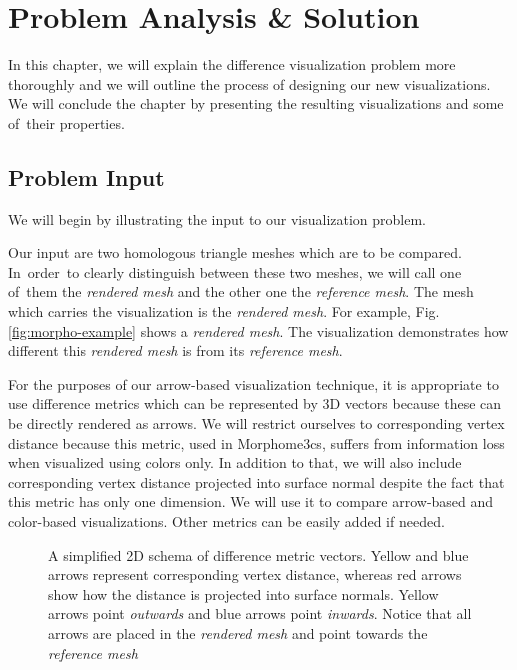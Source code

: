 \chapter{Problem Analysis \& Solution}
\label{chap:analysis}

In this chapter, we will explain the difference visualization problem more thoroughly and we will outline the process of designing our new visualizations. We will conclude the chapter by presenting the resulting visualizations and some of~their properties.

\section{Problem Input}
\label{sec:analysis-input}

We will begin by illustrating the input to our visualization problem.

Our input are two homologous triangle meshes which are to be compared. In~order~to clearly distinguish between these two meshes, we will call one of~them the {\it rendered mesh} and the other one the {\it reference mesh}. The mesh which carries the visualization is the {\it rendered mesh}. For example, Fig. \ref{fig:morpho-example} shows a {\it rendered mesh}. The visualization demonstrates how different this {\it rendered mesh} is from its {\it reference mesh}.

For the purposes of our arrow-based visualization technique, it is appropriate to use difference metrics which can be represented by 3D vectors because these can be directly rendered as arrows. We will restrict ourselves to corresponding vertex distance because this metric, used in Morphome3cs, suffers from information loss when visualized using colors only. In addition to that, we will also include corresponding vertex distance projected into surface normal despite the fact that this metric has only one dimension. We will use it to compare arrow-based and color-based visualizations. Other metrics can be easily added if needed.

\begin{figure}[h]
	\centering
	\def\svgwidth{\textwidth}
	
	\caption[Input illustration]{A simplified 2D schema of difference metric vectors. Yellow and blue arrows represent corresponding vertex distance, whereas red arrows show how the distance is projected into surface normals. Yellow arrows point {\it outwards} and blue arrows point {\it inwards}. Notice that all arrows are placed in the {\it rendered mesh} and point towards the {\it reference mesh}}
	\label{fig:illustration-problem_input}
\end{figure}

